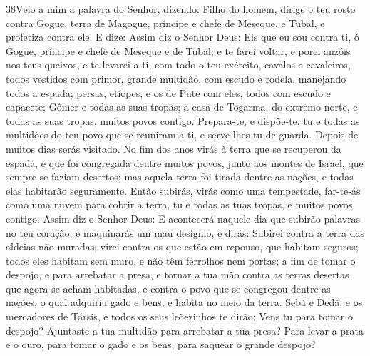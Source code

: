 \lettrine{38} Veio a mim a palavra do Senhor, dizendo:
Filho do homem, dirige o teu rosto contra Gogue, terra de
Magogue, príncipe e chefe de Meseque, e Tubal, e profetiza contra
ele. E dize: Assim diz o Senhor Deus: Eis que eu sou contra ti,
ó Gogue, príncipe e chefe de Meseque e de Tubal; e te farei
voltar, e porei anzóis nos teus queixos, e te levarei a ti, com todo
o teu exército, cavalos e cavaleiros, todos vestidos com primor,
grande multidão, com escudo e rodela, manejando todos a espada;
persas, etíopes, e os de Pute com eles, todos com escudo e
capacete; Gômer e todas as suas tropas; a casa de Togarma, do
extremo norte, e todas as suas tropas, muitos povos contigo.
Prepara-te, e dispõe-te, tu e todas as multidões do teu povo que
se reuniram a ti, e serve-lhes tu de guarda. Depois de muitos
dias serás visitado. No fim dos anos virás à terra que se recuperou
da espada, e que foi congregada dentre muitos povos, junto aos
montes de Israel, que sempre se faziam desertos; mas aquela terra
foi tirada dentre as nações, e todas elas habitarão seguramente.
Então subirás, virás como uma tempestade, far-te-ás como uma
nuvem para cobrir a terra, tu e todas as tuas tropas, e muitos povos
contigo. Assim diz o Senhor Deus: E acontecerá naquele dia
que subirão palavras no teu coração, e maquinarás um mau desígnio,
e dirás: Subirei contra a terra das aldeias não muradas;
virei contra os que estão em repouso, que habitam seguros; todos
eles habitam sem muro, e não têm ferrolhos nem portas; a fim
de tomar o despojo, e para arrebatar a presa, e tornar a tua mão
contra as terras desertas que agora se acham habitadas, e contra o
povo que se congregou dentre as nações, o qual adquiriu gado e bens,
e habita no meio da terra. Sebá e Dedã, e os mercadores de
Társis, e todos os seus leõezinhos te dirão: Vens tu para tomar o
despojo? Ajuntaste a tua multidão para arrebatar a tua presa? Para
levar a prata e o ouro, para tomar o gado e os bens, para saquear o
grande despojo?

